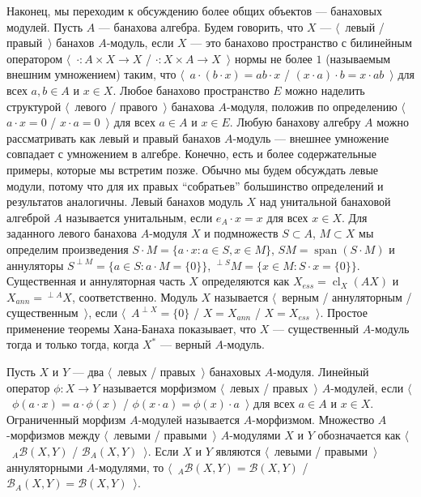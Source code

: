 Наконец, мы переходим к обсуждению более общих объектов --- банаховых модулей.
Пусть $A$ --- банахова алгебра. Будем говорить, что $X$ --- $\langle$~левый /
правый~$\rangle$ банахов $A$-модуль, если $X$ --- это банахово пространство с
билинейным оператором $\langle$~$\cdot:A\times X\to X$ / $\cdot: X\times A\to
X$~$\rangle$ нормы не более $1$ (называемым внешним умножением) таким, что
$\langle$~$a\cdot(b\cdot x)=ab\cdot x$ / $(x\cdot a)\cdot b=x\cdot ab$~$\rangle$
для всех $a,b\in A$ и $x\in X$. Любое банахово пространство $E$ можно наделить
структурой $\langle$~левого / правого~$\rangle$ банахова $A$-модуля, положив по
определению $\langle$~$a\cdot x=0$ / $x\cdot a=0$~$\rangle$ для всех $a\in A$ и
$x\in E$. Любую банахову алгебру $A$ можно рассматривать как левый и правый
банахов $A$-модуль --- внешнее умножение совпадает с умножением в алгебре.
Конечно, есть и более содержательные примеры, которые мы встретим позже. Обычно
мы будем обсуждать левые модули, потому что для их правых ``собратьев''
большинство определений и результатов аналогичны. Левый банахов модуль $X$ над
унитальной банаховой алгеброй $A$ называется унитальным, если $e_A\cdot x=x$ для
всех $x\in X$. Для заданного левого банахова $A$-модуля $X$ и подмножеств
$S\subset A$, $M\subset X$ мы определим произведения 
$S\cdot M=\{a\cdot x:a\in S, x\in M\}$, 
$SM=\operatorname{span} (S\cdot M)$ и аннуляторы 
$S^{\perp M}=\{ a\in S:a\cdot M=\{ 0 \} \}$, 
${}^{\perp S}M= \{x\in M: S\cdot x= \{0 \} \}$.
Существенная и аннуляторная часть $X$ определяются как
$X_{ess}=\operatorname{cl}_X(A X)$ и $X_{ann}={}^{\perp A}X$, соответственно.
Модуль $X$ называется $\langle$~верным / аннуляторным / существенным~$\rangle$,
если $\langle$~$A^{\perp X}=\{0\}$ / $X=X_{ann}$ / $X=X_{ess}$~$\rangle$.
Простое применение теоремы Хана-Банаха показывает, что $X$ --- существенный
$A$-модуль тогда и только тогда, когда $X^*$ --- верный $A$-модуль.

Пусть $X$ и $Y$ --- два $\langle$~левых / правых~$\rangle$ банаховых $A$-модуля.
Линейный оператор $\phi:X\to Y$ называется морфизмом $\langle$~левых /
правых~$\rangle$ $A$-модулей, если $\langle$~$\phi(a\cdot x)=a\cdot \phi(x)$ /
$\phi(x\cdot a)=\phi(x)\cdot a$~$\rangle$ для всех $a\in A$ и $x\in X$.
Ограниченный морфизм $A$-модулей называется $A$-морфизмом. Множество
$A$-морфизмов между $\langle$~левыми / правыми~$\rangle$ $A$-модулями $X$ и $Y$
обозначается как $\langle$~${}_A\mathcal{B}(X,Y)$ /
$\mathcal{B}_A(X,Y)$~$\rangle$. Если $X$ и $Y$ являются $\langle$~левыми /
правыми~$\rangle$ аннуляторными $A$-модулями, то
$\langle$~${}_A\mathcal{B}(X,Y)=\mathcal{B}(X,Y)$ /
$\mathcal{B}_A(X,Y)=\mathcal{B}(X,Y)$~$\rangle$.

